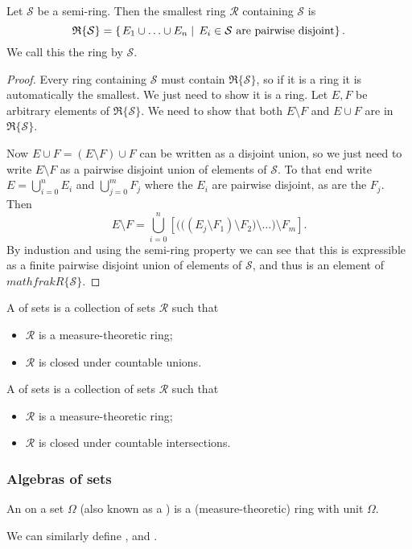 \begin{lemma}
Let $\mathcal{S}$ be a semi-ring. Then the smallest ring $\mathcal{R}$ containing $\mathcal{S}$ is
\[ \mathfrak{R}\{\mathcal{S}\} = \left\{\left. E_1\cup\ldots\cup E_n \;\right|\; \text{$E_i\in \mathcal{S}$ are pairwise disjoint} \right\}. \]
We call this the ring  by $\mathcal{S}$.
\end{lemma}
\begin{proof}
Every ring containing $\mathcal{S}$ must contain $\mathfrak{R}\{\mathcal{S}\}$, so if it is a ring it is automatically the smallest. We just need to show it is a ring. Let $E,F$ be arbitrary elements of $\mathfrak{R}\{\mathcal{S}\}$. We need to show that both $E\setminus F$ and $E\cup F$ are in $\mathfrak{R}\{\mathcal{S}\}$.

Now $E\cup F = (E\setminus F) \cup F$ can be written as a disjoint union, so we just need to write $E\setminus F$ as a pairwise disjoint union of elements of $\mathcal{S}$. To that end write $E = \bigcup_{i=0}^nE_i$ and $\bigcup_{j= 0}^mF_j$ where the $E_i$ are pairwise disjoint, as are the $F_j$. Then
\[ E\setminus F = \bigcup_{i=0}^n \left[ \Big(\big((E_j\setminus F_1)\setminus F_2\big)\setminus \ldots\Big)\setminus F_m \right]. \]
By industion and using the semi-ring property we can see that this is expressible as a finite pairwise disjoint union of elements of $\mathcal{S}$, and thus is an element of $mathfrak{R}\{\mathcal{S}\}$.
\end{proof}

\begin{definition}
A  of sets is a collection of sets $\mathcal{R}$ such that
\begin{itemize}
\item $\mathcal{R}$ is a measure-theoretic ring;
\item $\mathcal{R}$ is closed under countable unions.
\end{itemize}
A  of sets is a collection of sets $\mathcal{R}$ such that
\begin{itemize}
\item $\mathcal{R}$ is a measure-theoretic ring;
\item $\mathcal{R}$ is closed under countable intersections.
\end{itemize}
\end{definition}

\subsubsection{Algebras of sets}
\begin{definition}
An  on a set $\Omega$ (also known as a ) is a (measure-theoretic) ring with unit $\Omega$.

We can similarly define ,  and .
\end{definition}

